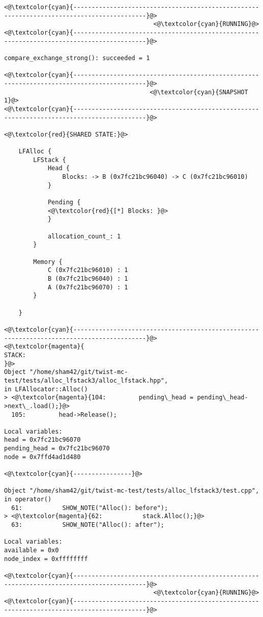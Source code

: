 \begin{adjustwidth}{-3.3cm}{-1cm}
\begin{allintypewriter}
\begin{multicols*}{2}
\begin{lstlisting}[numbers=none]
<@\textcolor{cyan}{------------------------------------------------------------------------------------------}@>
                                         <@\textcolor{cyan}{RUNNING}@>
<@\textcolor{cyan}{------------------------------------------------------------------------------------------}@>

compare_exchange_strong(): succeeded = 1

<@\textcolor{cyan}{------------------------------------------------------------------------------------------}@>
                                        <@\textcolor{cyan}{SNAPSHOT 1}@>
<@\textcolor{cyan}{------------------------------------------------------------------------------------------}@>

<@\textcolor{red}{SHARED STATE:}@>

    LFAlloc {
	    LFStack {
		    Head {
			    Blocks: -> B (0x7fc21bc96040) -> C (0x7fc21bc96010) 
		    }

		    Pending {
			<@\textcolor{red}{[*] Blocks: }@>
		    }

		    allocation_count_: 1
	    }

	    Memory {
		    C (0x7fc21bc96010) : 1
		    B (0x7fc21bc96040) : 1
		    A (0x7fc21bc96070) : 1
	    }

    }

<@\textcolor{cyan}{------------------------------------------------------------------------------------------}@>
<@\textcolor{magenta}{
STACK:
}@>
Object "/home/sham42/git/twist-mc-test/tests/alloc_lfstack3/alloc_lfstack.hpp",
in LFAllocator::Alloc()
> <@\textcolor{magenta}{104:         pending\_head = pending\_head->next\_.load();}@>
  105:         head->Release();

Local variables: 
head = 0x7fc21bc96070
pending_head = 0x7fc21bc96070
node = 0x7ffd4ad1d480

<@\textcolor{cyan}{----------------}@>

Object "/home/sham42/git/twist-mc-test/tests/alloc_lfstack3/test.cpp",
in operator()
  61:           SHOW_NOTE("Alloc(): before");
> <@\textcolor{magenta}{62:           stack.Alloc();}@>
  63:           SHOW_NOTE("Alloc(): after");

Local variables: 
available = 0x0
node_index = 0xffffffff

<@\textcolor{cyan}{------------------------------------------------------------------------------------------}@>
                                         <@\textcolor{cyan}{RUNNING}@>
<@\textcolor{cyan}{------------------------------------------------------------------------------------------}@>


\end{lstlisting}
\end{multicols*}
\end{allintypewriter}
\end{adjustwidth}
